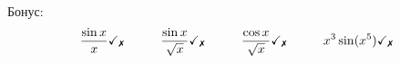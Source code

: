 \phantom{42}


\noindent
Бонус:
\begin{equation*}
    \frac{\sin x}{x} \checkmark_{\text{\xmark}} \hspace{1cm}
    \frac{\sin x}{\sqrt{x}} \checkmark_{\text{\xmark}} \hspace{1cm}
    \frac{\cos x}{\sqrt x} \checkmark_{\text{\xmark}} \hspace{1cm}
    x^3 \sin(x^5) \checkmark_{\text{\xmark}}
\end{equation*}
